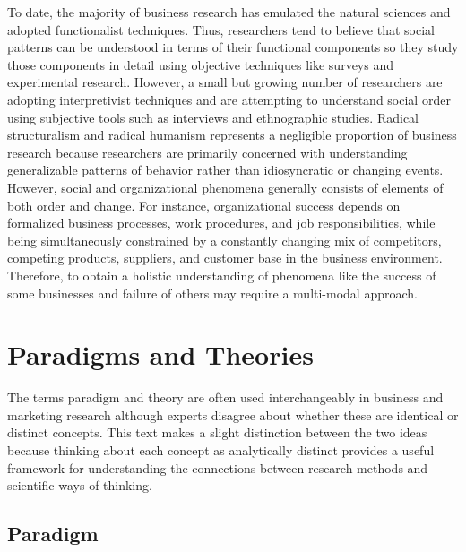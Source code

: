 To date, the majority of business research has emulated the natural sciences and adopted functionalist techniques. Thus, researchers tend to believe that social patterns can be understood in terms of their functional components so they study those components in detail using objective techniques like surveys and experimental research. However, a small but growing number of researchers are adopting interpretivist techniques and are attempting to understand social order using subjective tools such as interviews and ethnographic studies. Radical structuralism and radical humanism represents a negligible proportion of business research because researchers are primarily concerned with understanding generalizable patterns of behavior rather than idiosyncratic or changing events. However, social and organizational phenomena generally consists of elements of both order and change. For instance, organizational success depends on formalized business processes, work procedures, and job responsibilities, while being simultaneously constrained by a constantly changing mix of competitors, competing products, suppliers, and customer base in the business environment. Therefore, to obtain a holistic understanding of phenomena like the success of some businesses and failure of others may require a multi-modal approach.

\section{Paradigms and Theories}

The terms \gls{paradigm} and \gls{theory} are often used interchangeably in business and marketing research although experts disagree about whether these are identical or distinct concepts. This text makes a slight distinction between the two ideas because thinking about each concept as analytically distinct provides a useful framework for understanding the connections between research methods and scientific ways of thinking.

\subsection{Paradigm}

